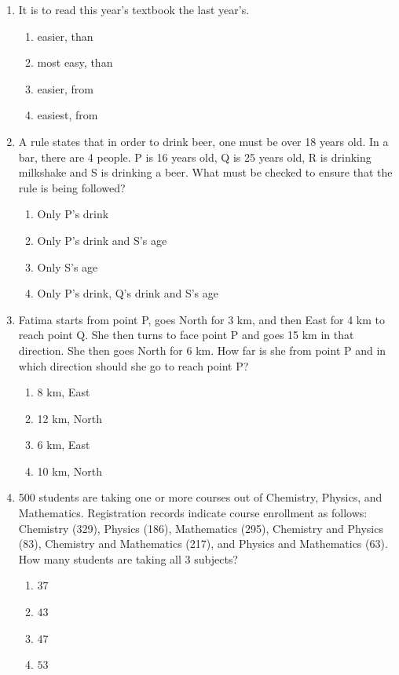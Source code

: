 \documentclass[journal]{IEEEtran}
\theoremstyle{remark}
\begin{document}
\begin{enumerate}
\item It is \underline {\hspace{2cm}} to read this year's textbook \underline {\hspace{2cm}} the last year's. \hfill{}
\begin{multicols}{4}
\begin{enumerate}
    \item easier, than
    \item most easy, than
    \item easier, from
    \item easiest, from
\end{enumerate}
\end{multicols}

\item A rule states that in order to drink beer, one must be over 18 years old. In a bar, there are 4 people. P is 16 years old, Q is 25 years old, R is drinking milkshake and S is drinking a beer. What must be checked to ensure that the rule is being followed? \hfill{}
\begin{enumerate}
    \item Only P's drink
    \item Only P's drink and S's age
    \item Only S's age
    \item Only P's drink, Q's drink and S's age
\end{enumerate}

\item Fatima starts from point P, goes North for 3 km, and then East for 4 km to reach point Q. She then turns to face point P and goes 15 km in that direction. She then goes North for 6 km. How far is she from point P and in which direction should she go to reach point P? \hfill{}
\begin{multicols}{4}
\begin{enumerate}
    \item 8 km, East
    \item 12 km, North
    \item 6 km, East
    \item 10 km, North
\end{enumerate}
\end{multicols}

\item 500 students are taking one or more courses out of Chemistry, Physics, and Mathematics. Registration records indicate course enrollment as follows: Chemistry (329), Physics (186), Mathematics (295), Chemistry and Physics (83), Chemistry and Mathematics (217), and Physics and Mathematics (63). How many students are taking all 3 subjects? \hfill{}
\begin{multicols}{4}
\begin{enumerate}
    \item $37$
    \item $43$
    \item $47$
    \item $53$
\end{enumerate}
\end{multicols}


\end{enumerate}
\end{document}

